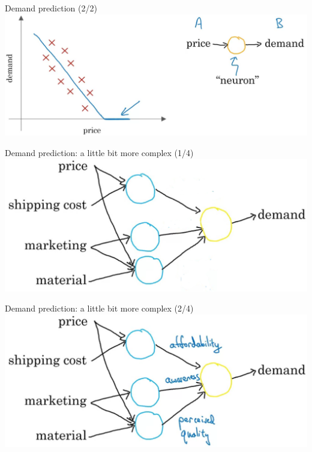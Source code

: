 \documentclass[pdf]{beamer}
\theoremstyle{mystyle}
\begin{document}
\begin{frame}{Demand prediction (2/2)}
	\centering
	\includegraphics[scale=.225]{demand-prediction-line}
\end{frame}

\begin{frame}{Demand prediction: a little bit more complex (1/4)}
	\centering
	\includegraphics[scale=.275]{demand-prediction-nn-0.png}
\end{frame}

\begin{frame}{Demand prediction: a little bit more complex (2/4)}
	\centering
	\includegraphics[scale=.275]{demand-prediction-nn.png}
\end{frame}
\end{document}
